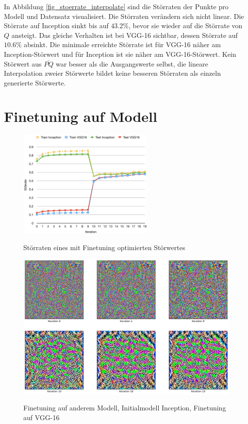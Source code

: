 \documentclass{FFHS_Thesis_Additions/ffhsthesis}
\begin{document}
In Abbildung \ref{fig_stoerrate_interpolate} sind die Störraten der Punkte pro Modell und Datensatz visualisiert. 
Die Störraten verändern sich nicht linear. 
Die Störrate auf Inception sinkt bis auf $43.2\%$, bevor sie wieder auf die Störrate von $Q$ ansteigt. 
Das gleiche Verhalten ist bei VGG-16 sichtbar, dessen Störrate auf $10.6\%$ absinkt. 
Die minimale erreichte Störrate ist für VGG-16 näher am Inception-Störwert und für Inception ist sie näher am VGG-16-Störwert. 
Kein Störwert aus $\overline{PQ}$ war besser als die Ausgangswerte selbst, die lineare Interpolation zweier Störwerte bildet keine besseren Störraten als einzeln generierte Störwerte.

\section{Finetuning auf Modell}

\begin{figure}[h]
\caption{Störraten eines mit Finetuning optimierten Störwertes}
\centering
\includegraphics[width=0.6\textwidth]{./images/stoerrate_finetuning.png}
\label{fig_stoerrate_finetuning}
\end{figure}


\begin{figure}[h]
\caption{Finetuning auf anderem Modell, Initialmodell Inception, Finetuning auf VGG-16}
\centering
\includegraphics[width=\textwidth]{./images/comb1_inception_vgg16.png} 
\label{fig_stoerwerte_finetuning}
\end{figure}
\end{document}
